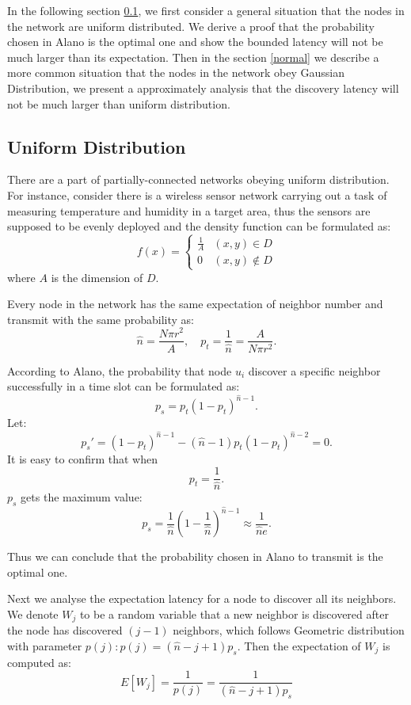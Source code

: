 In the following section \ref{uniform}, we first consider a general situation that the nodes
in the network are uniform distributed. We derive a proof that the probability
chosen in Alano is the optimal one and show the bounded latency will not 
be much larger than its expectation. Then in the section  \ref{normal} we describe a more
common situation that the nodes in the network obey Gaussian Distribution, we present a 
approximately analysis that the discovery latency will not be much larger than uniform distribution.


\subsection{Uniform Distribution}
\label{uniform}
There are a part of partially-connected networks obeying uniform distribution. 
For instance, consider there is a  wireless sensor network carrying out a task of
measuring temperature and humidity in a target area, 
thus the sensors are supposed to be evenly deployed and the density function can be 
formulated as:
$$f(x)=
\begin{cases}
\frac{1}{A}& (x,y)\in D\\
0& (x,y)\notin D
\end{cases}$$
where $A$ is the dimension of $D$.

Every node in the network has the same expectation 
of neighbor number and transmit with the same probability as:
$$
\hat{n} = \frac{N\pi r^2}{A}, \quad p_t = \frac{1}{\hat{n}}=\frac{A}{N\pi r^2}.
$$  

According to Alano, the probability that node $u_i$ discover a specific
neighbor successfully in a time slot can be formulated as:
$$
p_s = p_t{(1-p_t)}^{\hat{n}-1}.
$$
Let:
$$
p_s' = {(1-p_t)}^{\hat{n}-1}-(\hat{n}-1)p_t{(1-p_t)}^{\hat{n}-2}=0.
$$
It is easy to confirm that  when
$$p_t=\frac{1}{\hat{n}}.$$ 
$p_s$ gets the maximum value:
$$p_s = \frac{1}{\hat{n}}{(1-\frac{1}{\hat{n}})}^{\hat{n}-1} \approx \frac{1}{\hat{n}e}.$$

Thus we can conclude that the probability chosen in Alano
to transmit is the optimal one. 

Next we analyse the expectation latency for a node to discover all its 
neighbors. We denote $W_j$ to be a random variable that a new neighbor
is discovered after the node has discovered $(j-1)$ neighbors, which follows 
Geometric distribution with parameter $p(j): p(j)=(\hat{n}-j+1)p_s$. Then the expectation
of $W_j$ is computed as:
$$
E[W_j]=\frac{1}{p(j)}=\frac{1}{(\hat{n}-j+1)p_s}
$$

